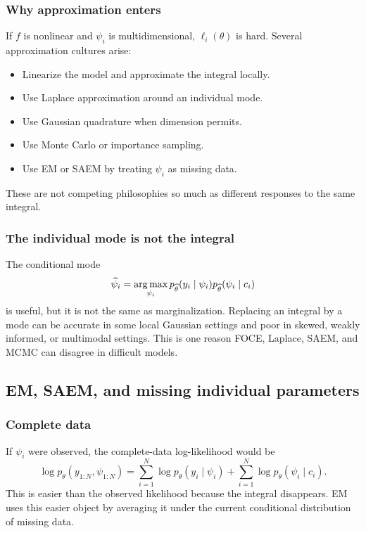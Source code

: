 \subsubsection*{Why approximation enters}

If \(f\) is nonlinear and \(\psi_i\) is multidimensional, \(\ell_i(\theta)\) is hard.  Several approximation cultures arise:
\begin{itemize}[leftmargin=2em]
  \item Linearize the model and approximate the integral locally.
  \item Use Laplace approximation around an individual mode.
  \item Use Gaussian quadrature when dimension permits.
  \item Use Monte Carlo or importance sampling.
  \item Use EM or SAEM by treating \(\psi_i\) as missing data.
\end{itemize}
These are not competing philosophies so much as different responses to the same integral.

\subsubsection*{The individual mode is not the integral}

The conditional mode
\[
  \widehat\psi_i
  =
  \operatorname*{arg\,max}_{\psi_i}
  p_{\widehat\theta}(y_i\mid\psi_i)p_{\widehat\theta}(\psi_i\mid c_i)
\]
is useful, but it is not the same as marginalization.  Replacing an integral by a mode can be accurate in some local Gaussian settings and poor in skewed, weakly informed, or multimodal settings.  This is one reason FOCE, Laplace, SAEM, and MCMC can disagree in difficult models.

\subsection{EM, SAEM, and missing individual parameters}

\subsubsection*{Complete data}

If \(\psi_i\) were observed, the complete-data log-likelihood would be
\[
  \log p_\theta(y_{1:N},\psi_{1:N})
  =
  \sum_{i=1}^{N}
  \log p_\theta(y_i\mid\psi_i)
  +
  \sum_{i=1}^{N}
  \log p_\theta(\psi_i\mid c_i).
\]
This is easier than the observed likelihood because the integral disappears.  EM uses this easier object by averaging it under the current conditional distribution of missing data.

